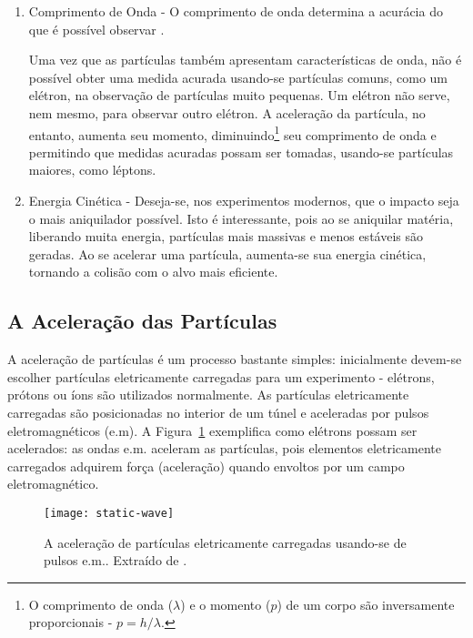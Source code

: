 \begin{enumerate}
\item Comprimento de Onda - O comprimento de onda determina a acurácia do que
é possível observar \cite{partadv}.

Uma vez que as par\-tí\-culas tam\-bém apresentam caracte\-rís\-ticas de onda,
não é pos\-sí\-vel obter uma medida acurada usando-se partículas comuns, como
um e\-lé\-tron, na observação de partículas muito pequenas. Um elétron não
serve, nem mesmo, para observar outro elétron. A aceleração da partícula, no
entanto, aumenta seu momento, diminuindo\footnote{O comprimento de onda
($\lambda$) e o momento ($p$) de um corpo são inversamente proporcionais -
$p=h/\lambda$.} seu comprimento de onda e permitindo que medidas acuradas
possam ser tomadas, usando-se partículas maiores, como léptons.

\item Energia Cinética - Deseja-se, nos experimentos modernos, que o impacto
seja o mais aniquilador possível. Isto é interessante, pois ao se aniquilar
matéria, liberando muita energia, partículas mais massivas e menos estáveis são
geradas. Ao se acelerar uma partícula, aumenta-se sua energia cinética,
tornando a colisão com o alvo mais eficiente.
\end{enumerate}

\subsection{A Aceleração das Partículas}

A aceleração de partículas  é um processo
bastante simples: inicialmente devem-se escolher partículas eletricamente
carregadas para um experimento - e\-lé\-trons, pró\-tons ou íons são
utilizados normalmente. As par\-tí\-culas eletricamente carregadas são
posicionadas no interior de um túnel e aceleradas por pulsos
eletromagnéticos (e.m). A
Figura~\ref{fig:acelera} exemplifica como elétrons possam ser acelerados: as
ondas e.m. aceleram as partículas, pois elementos eletricamente carregados
adquirem força (aceleração) quando envoltos por um campo eletromagnético.

\begin{figure}
\begin{center}
\texttt{[image: static-wave]}
\end{center}
\caption[A aceleração de partículas.]{A aceleração de partículas eletricamente
carregadas usando-se de pulsos e.m.. Extraído de \cite{partadv}.}
\label{fig:acelera}
\end{figure}


